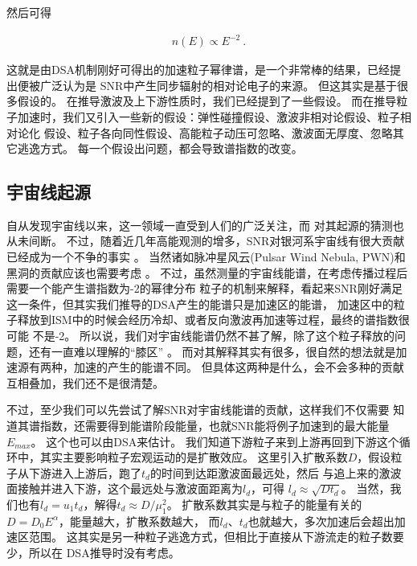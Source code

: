 然后可得

\begin{equation}
    \begin{aligned}
      n(E) \propto E^{-2} \ .
    \end{aligned}
\end{equation}

这就是由DSA机制刚好可得出的加速粒子幂律谱，是一个非常棒的结果，已经提出便被广泛认为是
SNR中产生同步辐射的相对论电子的来源。
但这其实是基于很多假设的。
在推导激波及上下游性质时，我们已经提到了一些假设。
而在推导粒子加速时，我们又引入一些新的假设：弹性碰撞假设、激波非相对论假设、粒子相对论化
假设、粒子各向同性假设、高能粒子动压可忽略、激波面无厚度、忽略其它逃逸方式。
每一个假设出问题，都会导致谱指数的改变。

\subsection{宇宙线起源}
自从\citet{hess1912beobachtungen}发现宇宙线以来，这一领域一直受到人们的广泛关注，而
对其起源的猜测也从未间断\citep{Reynolds2008a}。
不过，随着近几年高能观测的增多，SNR对银河系宇宙线有很大贡献已经成为一个不争的事实
\citep{Ackermann2013, Joubert2016, Jogler2016}。
当然诸如脉冲星风云(Pulsar Wind Nebula, PWN)和黑洞的贡献应该也需要考虑
\citep{Abeysekara2018, Profumo2018}。
不过，虽然测量的宇宙线能谱，在考虑传播过程后需要一个能产生谱指数为-2的幂律分布
粒子的机制来解释，看起来SNR刚好满足这一条件，但其实我们推导的DSA产生的能谱只是加速区的能谱，
加速区中的粒子释放到ISM中的时候会经历冷却、或者反向激波再加速等过程，最终的谱指数很可能
不是-2。
所以说，我们对宇宙线能谱仍然不甚了解，除了这个粒子释放的问题，还有一直难以理解的“膝区”
\citep{Hoerandel2003}。
而对其解释其实有很多，很自然的想法就是加速源有两种，加速的产生的能谱不同。
但具体这两种是什么，会不会多种的贡献互相叠加，我们还不是很清楚。

不过，至少我们可以先尝试了解SNR对宇宙线能谱的贡献\citep{Ptuskin2010}，这样我们不仅需要
知道其谱指数，还需要得到能谱阶段能量，也就SNR能将例子加速到的最大能量$E_{max}$。
这个也可以由DSA来估计。
我们知道下游粒子来到上游再回到下游这个循环中，其实主要影响粒子宏观运动的是扩散效应。
这里引入扩散系数$D$，假设粒子从下游进入上游后，跑了$t_d$的时间到达距激波面最远处，然后
与追上来的激波面接触并进入下游，这个最远处与激波面距离为$l_d$，可得
$l_{d} \approx \sqrt{D t_{d}}$。
当然，我们也有$l_{d}=u_{1} t_{d}$，解得$t_d \approx D/\mu_1^2$。
扩散系数其实是与粒子的能量有关的$D=D_{0} E^{\alpha}$，能量越大，扩散系数越大，
而$l_{d}$、$t_{d}$也就越大，多次加速后会超出加速区范围。
这其实是另一种粒子逃逸方式\citep{Li2012}，但相比于直接从下游流走的粒子数要少，所以在
DSA推导时没有考虑。

